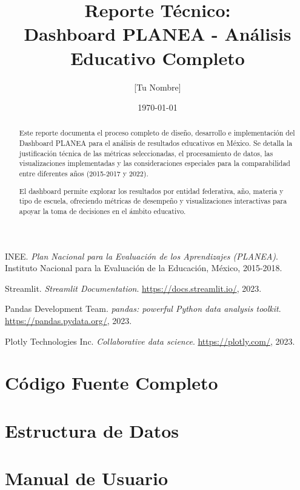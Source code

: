 \documentclass[12pt]{report}
\title{\Huge{Reporte Técnico:\\Dashboard PLANEA - Análisis Educativo Completo}}
\author{[Tu Nombre]}
\date{\today}
\begin{document}
\maketitle
\thispagestyle{empty}

\begin{abstract}
    Este reporte documenta el proceso completo de diseño, desarrollo e implementación del Dashboard PLANEA para el análisis de resultados educativos en México. Se detalla la justificación técnica de las métricas seleccionadas, el procesamiento de datos, las visualizaciones implementadas y las consideraciones especiales para la comparabilidad entre diferentes años (2015-2017 y 2022).
    
    El dashboard permite explorar los resultados por entidad federativa, año, materia y tipo de escuela, ofreciendo métricas de desempeño y visualizaciones interactivas para apoyar la toma de decisiones en el ámbito educativo.
\end{abstract}

\tableofcontents
\listoffigures
\listoftables












\begin{thebibliography}{9}

  INEE. 
  \textit{Plan Nacional para la Evaluación de los Aprendizajes (PLANEA)}. 
  Instituto Nacional para la Evaluación de la Educación, 
  México, 2015-2018.

  Streamlit. 
  \textit{Streamlit Documentation}. 
  \url{https://docs.streamlit.io/}, 
  2023.

  Pandas Development Team. 
  \textit{pandas: powerful Python data analysis toolkit}. 
  \url{https://pandas.pydata.org/}, 
  2023.

  Plotly Technologies Inc. 
  \textit{Collaborative data science}. 
  \url{https://plotly.com/}, 
  2023.

\end{thebibliography}

\appendix
\chapter{Código Fuente Completo}
\chapter{Estructura de Datos}
\chapter{Manual de Usuario}
\end{document}
